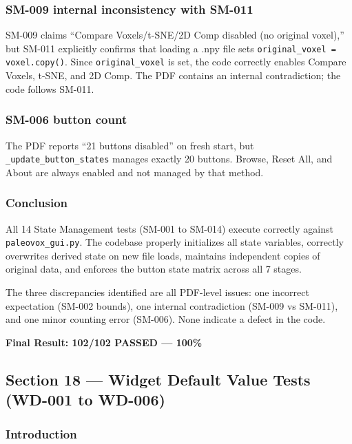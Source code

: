 \documentclass[12pt,a4paper]{article}
\begin{document}
\subsubsection{SM-009 internal inconsistency with SM-011}
SM-009 claims ``Compare Voxels/t-SNE/2D Comp disabled (no original voxel),''
but SM-011 explicitly confirms that loading a .npy file sets
\texttt{original\_voxel = voxel.copy()}. Since \texttt{original\_voxel} is set,
the code correctly enables Compare Voxels, t-SNE, and 2D Comp.
The PDF contains an internal contradiction; the code follows SM-011.

\subsubsection{SM-006 button count}
The PDF reports ``21 buttons disabled'' on fresh start, but
\texttt{\_update\_button\_states} manages exactly 20 buttons.
Browse, Reset All, and About are always enabled and not managed by that method.

\subsubsection{Conclusion}

All 14 State Management tests (SM-001 to SM-014) execute correctly against
\texttt{paleovox\_gui.py}. The codebase properly initializes all state variables,
correctly overwrites derived state on new file loads, maintains independent copies
of original data, and enforces the button state matrix across all 7 stages.

The three discrepancies identified are all PDF-level issues: one incorrect
expectation (SM-002 bounds), one internal contradiction (SM-009 vs SM-011),
and one minor counting error (SM-006). None indicate a defect in the code.

\vspace{12pt}
\textbf{Final Result: 102/102 PASSED --- 100\%}

\newpage

\subsection{Section 18 --- Widget Default Value Tests (WD-001 to WD-006)}

\subsubsection{Introduction}
\end{document}
